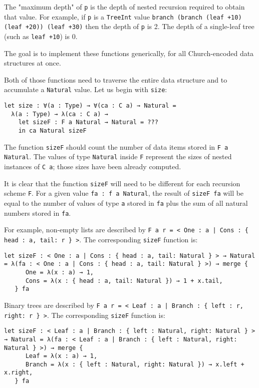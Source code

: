 The "maximum depth" of \lstinline!p! is the depth of nested recursion required to obtain that value. For example, if \lstinline!p! is a \lstinline!TreeInt!
value \lstinline!branch (branch (leaf +10) (leaf +20)) (leaf +30)! then the depth of \lstinline!p! is 2. The depth of a single-leaf tree (such as \lstinline!leaf +10!) is 0.


The goal is to implement these functions generically, for all Church-encoded data structures at once.


Both of those functions need to traverse the entire data structure and to accumulate a \lstinline!Natural! value. Let us begin with \lstinline!size!:


\begin{lstlisting}[language=Dhall]
let size : ∀(a : Type) → ∀(ca : C a) → Natural =
  λ(a : Type) → λ(ca : C a) →
    let sizeF : F a Natural → Natural = ??? 
    in ca Natural sizeF
\end{lstlisting}


The function \lstinline!sizeF! should count the number of data items stored in \lstinline!F a Natural!. The values of type \lstinline!Natural! inside \lstinline!F! represent the sizes of nested
instances of \lstinline!C a!; those sizes have been already computed.


It is clear that the function \lstinline!sizeF! will need to be different for each recursion scheme \lstinline!F!.
For a given value \lstinline!fa : f a Natural!, the result of \lstinline!sizeF fa! will be equal to the number of values of type \lstinline!a! stored in \lstinline!fa! plus the sum of all natural
numbers stored in \lstinline!fa!.


For example, non-empty lists are described by \lstinline!F a r = < One : a | Cons : { head : a, tail: r } >!.
The corresponding \lstinline!sizeF! function is:


\begin{lstlisting}[language=Dhall]
let sizeF : < One : a | Cons : { head : a, tail: Natural } > → Natural = λ(fa : < One : a | Cons : { head : a, tail: Natural } >) → merge {
      One = λ(x : a) → 1,
      Cons = λ(x : { head : a, tail: Natural }) → 1 + x.tail,
   } fa
\end{lstlisting}


Binary trees are described by \lstinline!F a r = < Leaf : a | Branch : { left : r, right: r } >!.
The corresponding \lstinline!sizeF! function is:


\begin{lstlisting}[language=Dhall]
let sizeF : < Leaf : a | Branch : { left : Natural, right: Natural } > → Natural = λ(fa : < Leaf : a | Branch : { left : Natural, right: Natural } >) → merge {
      Leaf = λ(x : a) → 1,
      Branch = λ(x : { left : Natural, right: Natural }) → x.left + x.right,
   } fa
\end{lstlisting}


